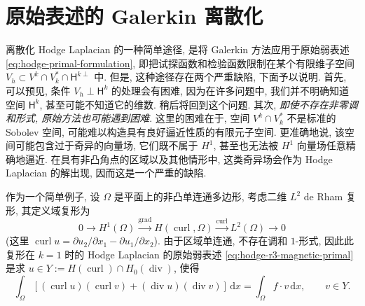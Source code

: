 \section{原始表述的 Galerkin 离散化}\label{sec:primal-galerkin}

离散化 Hodge Laplacian 的一种简单途径, 是将 Galerkin 方法应用于原始弱表述 \eqref{eq:hodge-primal-formulation}, 即把试探函数和检验函数限制在某个有限维子空间 $V_h\subset V^k\cap V_k^*\cap\mathsf H^{k\perp}$ 中. 但是, 这种途径存在两个严重缺陷, 下面予以说明. 首先, 可以预见, 条件 $V_h\perp\mathsf H^k$ 的处理会有困难, 因为在许多问题中, 我们并不明确知道空间 $\mathsf H^k$, 甚至可能不知道它的维数. 稍后将回到这个问题. 其次, \emph{即使不存在非零调和形式, 原始方法也可能遇到困难}. 这里的困难在于, 空间 $V^k\cap V_k^*$ 不是标准的 Sobolev 空间, 可能难以构造具有良好逼近性质的有限元子空间. 更准确地说, 该空间可能包含过于奇异的向量场, 它们既不属于 $H^1$, 甚至也无法被 $H^1$ 向量场任意精确地逼近. 在具有非凸角点的区域以及其他情形中, 这类奇异场会作为 Hodge Laplacian 的解出现, 因而这是一个严重的缺陷.

作为一个简单例子, 设 $\Omega$ 是平面上的非凸单连通多边形, 考虑二维 $L^2$ de Rham 复形, 其定义域复形为
\[
0\to H^1(\Omega)\xrightarrow{\operatorname{grad}}H(\operatorname{curl},\Omega)\xrightarrow{\operatorname{curl}}L^2(\Omega)\to0
\]
(这里 $\operatorname{curl}u=\partial u_2/\partial x_1-\partial u_1/\partial x_2$). 由于区域单连通, 不存在调和 $1$-形式, 因此此复形在 $k=1$ 时的 Hodge Laplacian 的原始弱表述 \eqref{eq:hodge-r3-magnetic-primal} 是求 $u\in Y:=H(\operatorname{curl})\cap H_{0}(\operatorname{div})$, 使得
\begin{equation}\label{eq:primal-galerkin-polygon}
\int_\Omega[(\operatorname{curl}u)(\operatorname{curl}v)+(\operatorname{div}u)(\operatorname{div}v)]\,\mathrm{d}x=\int_\Omega f\cdot v\,\mathrm{d}x,\qquad v\in Y.
\end{equation}

